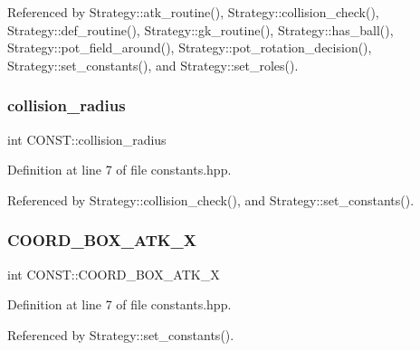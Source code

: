 Referenced by Strategy\+::atk\+\_\+routine(), Strategy\+::collision\+\_\+check(), Strategy\+::def\+\_\+routine(), Strategy\+::gk\+\_\+routine(), Strategy\+::has\+\_\+ball(), Strategy\+::pot\+\_\+field\+\_\+around(), Strategy\+::pot\+\_\+rotation\+\_\+decision(), Strategy\+::set\+\_\+constants(), and Strategy\+::set\+\_\+roles().

\mbox{\label{namespace_c_o_n_s_t_a793c8da95030a92162ffac2d4dbe7a27}} 
\subsubsection{\texorpdfstring{collision\+\_\+radius}{collision\_radius}}
{\footnotesize\ttfamily int C\+O\+N\+S\+T\+::collision\+\_\+radius\hspace{0.3cm}{\ttfamily [static]}}



Definition at line 7 of file constants.\+hpp.



Referenced by Strategy\+::collision\+\_\+check(), and Strategy\+::set\+\_\+constants().

\mbox{\label{namespace_c_o_n_s_t_a18d16256fcefad7961c73c9546127750}} 
\subsubsection{\texorpdfstring{C\+O\+O\+R\+D\+\_\+\+B\+O\+X\+\_\+\+A\+T\+K\+\_\+X}{COORD\_BOX\_ATK\_X}}
{\footnotesize\ttfamily int C\+O\+N\+S\+T\+::\+C\+O\+O\+R\+D\+\_\+\+B\+O\+X\+\_\+\+A\+T\+K\+\_\+X\hspace{0.3cm}{\ttfamily [static]}}



Definition at line 7 of file constants.\+hpp.



Referenced by Strategy\+::set\+\_\+constants().

\mbox{\label{namespace_c_o_n_s_t_a7d27201b3e7475f3c8141242fa75a026}} 
